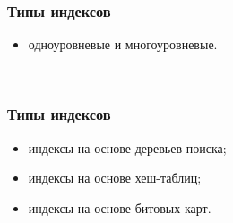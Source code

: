 \documentclass{bmstu-pr}
\begin{document}
\begin{frame}
    \frametitle{Типы индексов}

    \begin{itemize}
        \item одноуровневые и многоуровневые.
    \end{itemize}
    ~\\

    \centering{}
\end{frame}

\begin{frame}
    \frametitle{Типы индексов}

    \begin{itemize}
        \item индексы на основе деревьев поиска;
        \item индексы на основе хеш-таблиц;
        \item индексы на основе битовых карт.
    \end{itemize}

\end{frame}

\begin{frame}
    \frametitle{}
\end{frame}

\begin{frame}
    \frametitle{}
\end{frame}

\begin{frame}
    \frametitle{}
\end{frame}

\begin{frame}
    \frametitle{}
\end{frame}
\end{document}
